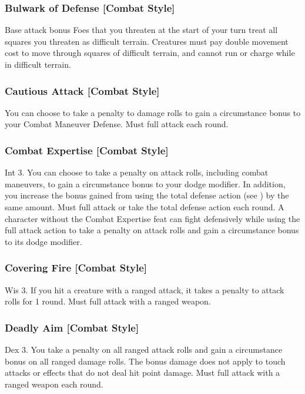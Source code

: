 \subsubsection{Bulwark of Defense [Combat Style]}
 Base attack bonus 
 Foes that you threaten at the start of your turn treat all squares you threaten as difficult terrain. Creatures must pay double movement cost to move through squares of difficult terrain, and cannot run or charge while in difficult terrain.

\subsubsection{Cautious Attack [Combat Style]}
 You can choose to take a  penalty to damage rolls to gain a  circumstance bonus to your Combat Maneuver Defense. \bonusscalingdescription
{} Must full attack each round.

\subsubsection{Combat Expertise [Combat Style]}
 Int 3.
 You can choose to take a  penalty on attack rolls, including combat maneuvers, to gain a  circumstance bonus to your dodge modifier. \bonusscalingdescription In addition, you increase the bonus gained from using the total defense action (see ) by the same amount.
 Must full attack or take the total defense action each round.
 A character without the Combat Expertise feat can fight defensively while using the full attack action to take a  penalty on attack rolls and gain a  circumstance bonus to its dodge modifier.

\subsubsection{Covering Fire [Combat Style]}
 Wis 3.
 If you hit a creature with a ranged attack, it takes a  penalty to attack rolls for 1 round.
 Must full attack with a ranged weapon.

\subsubsection{Deadly Aim [Combat Style]}
 Dex 3.
 You take a  penalty on all ranged attack rolls and gain a  circumstance bonus on all ranged damage rolls. \bonusscalingdescription The bonus damage does not apply to touch attacks or effects that do not deal hit point damage.
 Must full attack with a ranged weapon each round.

